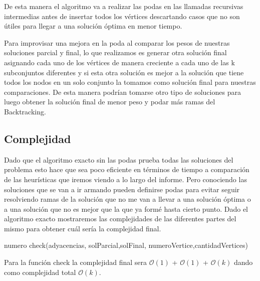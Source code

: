 De esta manera el algoritmo va a realizar las podas en las llamadas recursivas intermedias antes de insertar todos los vértices descartando casos que no son útiles para llegar a una solución óptima en menor tiempo.

Para improvisar una mejora en la poda al comparar los pesos de nuestras soluciones parcial y final, lo que realizamos es generar otra solución final asignando cada uno de los vértices de manera creciente a cada uno de las k subconjuntos diferentes y si esta otra solución es mejor a la solución que tiene todos los nodos en un solo conjunto la tomamos como solución final para nuestras comparaciones.
De esta manera podrían tomarse otro tipo de soluciones para luego obtener la solución final de menor peso y podar más ramas del Backtracking.	

\subsection{Complejidad}
Dado que el algoritmo exacto sin las podas prueba todas las soluciones del problema esto hace que sea poco eficiente en términos de tiempo a comparación de las heurísticas que iremos viendo a lo largo del informe. Pero conociendo las soluciones que se van a ir armando pueden definirse podas para evitar seguir resolviendo ramas de la solución que no me van a llevar a una solución óptima o a una solución que no es mejor que la que ya formé hasta cierto punto.
Dado el algoritmo exacto mostraremos las complejidades de las diferentes partes del mismo para obtener cuál sería la complejidad final.

\begin{algorithm}
  \begin{algorithmic}[1]\parskip=1mm
 \caption{numero check(adyacencias, solParcial,solFinal, numeroVertice,cantidadVertices)}
  \end{algorithmic}
  \end{algorithm}

Para la función check la complejidad final sera $\mathcal{O}(1)$ + $\mathcal{O}(1)$ + $\mathcal{O}(k)$ dando como complejidad total $\mathcal{O}(k)$.


